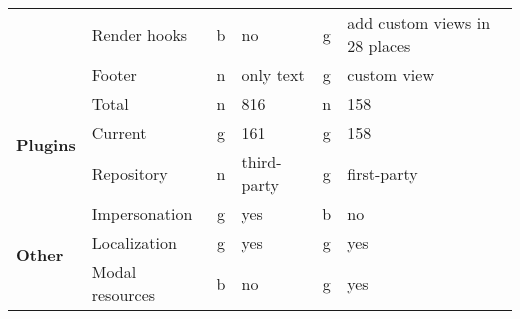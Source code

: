\begin{table}[!ht]
{\begin{tabular}{llclcl}
            & Render hooks           & b  & no                             & g  & add custom views in 28 places           \\
            & Footer                 & n  & only text                      & g  & custom view                             \\
            \hline
            \multirow{3}{*}{\textbf{Plugins}}        & Total                  & n  & 816                            & n  & 158                                     \\
            & Current                & g  & 161                            & g  & 158                                     \\
            & Repository             & n  & third-party                    & g  & first-party                             \\
            \hline
            \multirow{3}{*}{\textbf{Other}}          & Impersonation          & g  & yes                            & b  & no                                      \\
            & Localization           & g  & yes                            & g  & yes                                     \\
            & Modal resources        & b  & no                             & g  & yes
        \end{tabular}%
    }
\end{table}
